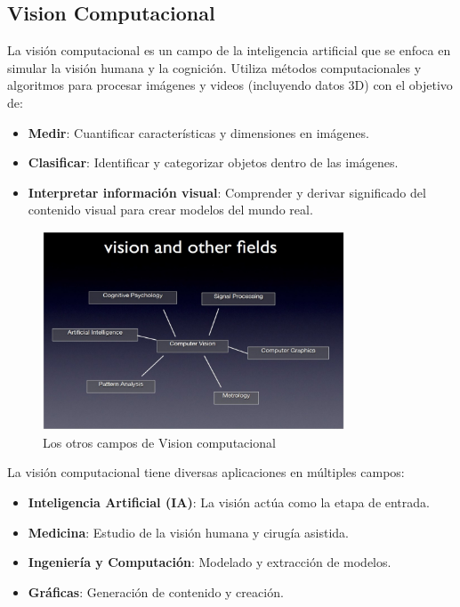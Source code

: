 
\subsection{Vision Computacional \citep*{vc1}}
La visión computacional es un campo de la inteligencia artificial que se enfoca en simular la visión humana y la cognición. Utiliza métodos computacionales y algoritmos para procesar imágenes y videos (incluyendo datos 3D) con el objetivo de:


\begin{itemize}
	\item \textbf{Medir}: Cuantificar características y dimensiones en imágenes.
	\item \textbf{Clasificar}: Identificar y categorizar objetos dentro de las imágenes.
	\item \textbf{Interpretar información visual}: Comprender y derivar significado del contenido visual para crear modelos del mundo real.
\end{itemize}

\begin{figure}[H]
	\begin{center}
		\includegraphics[width=0.8\textwidth]{2/figures/vc1.jpeg}
		\caption{Los otros campos de Vision computacional}
		\label{}
	\end{center}
	
\end{figure}

La visión computacional tiene diversas aplicaciones en múltiples campos:

\begin{itemize}
	\item \textbf{Inteligencia Artificial (IA)}: La visión actúa como la etapa de entrada.
	\item \textbf{Medicina}: Estudio de la visión humana y cirugía asistida.
	\item \textbf{Ingeniería y Computación}: Modelado y extracción de modelos.
	\item \textbf{Gráficas}: Generación de contenido y creación.
\end{itemize}

